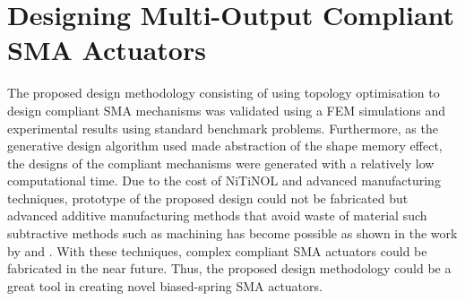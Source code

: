 \section{Designing Multi-Output Compliant SMA Actuators}
The proposed design methodology consisting of using topology optimisation to design compliant SMA mechanisms was validated using a FEM simulations and experimental results using standard benchmark problems. Furthermore, as the generative design algorithm used made abstraction of the shape memory effect, the designs of the compliant mechanisms were generated with a relatively low computational time. Due to the cost of NiTiNOL and advanced manufacturing techniques, prototype of the proposed design could not be fabricated but advanced additive manufacturing methods that avoid waste of material such subtractive methods such as machining has become possible as shown in the work by \todocite and \todocite. With these techniques, complex compliant SMA actuators could be fabricated in the near future. Thus, the proposed design methodology could be a great tool in creating novel biased-spring SMA actuators.


